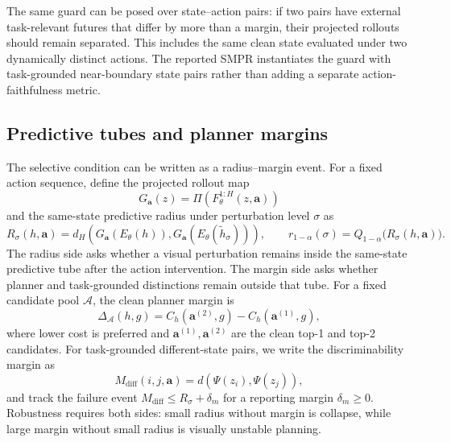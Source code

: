 \documentclass[10pt]{article}
\begin{document}
The same guard can be posed over state--action pairs: if two pairs have external task-relevant futures that differ by more than a margin, their projected rollouts should remain separated. This includes the same clean state evaluated under two dynamically distinct actions. The reported SMPR instantiates the guard with task-grounded near-boundary state pairs rather than adding a separate action-faithfulness metric.

\subsection{Predictive tubes and planner margins}\label{sec:acpc-radius-margin}

The selective condition can be written as a radius--margin event. For a fixed action sequence, define the projected rollout map
\begin{equation}
  G_{\mathbf a}(z)=\Pi(F_\theta^{1:H}(z,\mathbf a))
\end{equation}
and the same-state predictive radius under perturbation level $\sigma$ as
\begin{equation}
  R_\sigma(h,\mathbf a)
  = d_H\!\left(G_{\mathbf a}(E_\theta(h)),G_{\mathbf a}(E_\theta(\tilde h_\sigma))\right),
  \qquad
  r_{1-\alpha}(\sigma)=Q_{1-\alpha}\big(R_\sigma(h,\mathbf a)\big).
  \label{eq:predictive-radius}
\end{equation}
The radius side asks whether a visual perturbation remains inside the same-state predictive tube after the action intervention. The margin side asks whether planner and task-grounded distinctions remain outside that tube. For a fixed candidate pool $\mathcal A$, the clean planner margin is
\begin{equation}
  \Delta_{\mathcal A}(h,g)
  = C_h(\mathbf a^{(2)},g)-C_h(\mathbf a^{(1)},g),
  \label{eq:planner-margin}
\end{equation}
where lower cost is preferred and $\mathbf a^{(1)},\mathbf a^{(2)}$ are the clean top-1 and top-2 candidates. For task-grounded different-state pairs, we write the discriminability margin as
\begin{equation}
  M_{\mathrm{diff}}(i,j,\mathbf a)
  = d\!\left(\Psi(z_i),\Psi(z_j)\right),
  \label{eq:diff-margin}
\end{equation}
and track the failure event $M_{\mathrm{diff}}\le R_\sigma+\delta_m$ for a reporting margin $\delta_m\ge0$. Robustness requires both sides: small radius without margin is collapse, while large margin without small radius is visually unstable planning.
\end{document}

